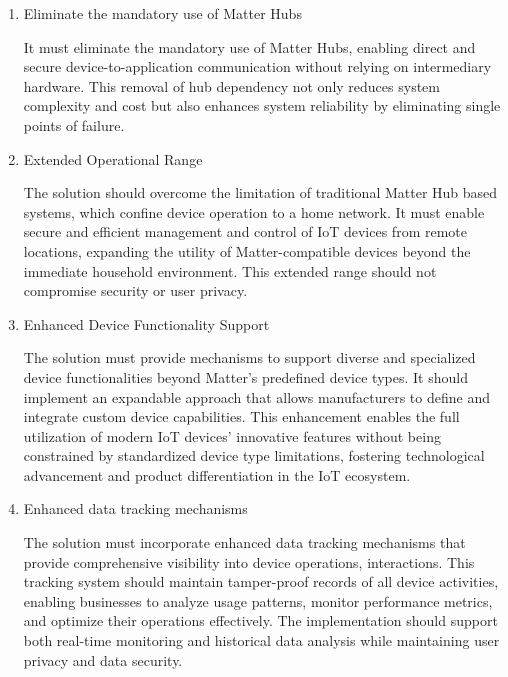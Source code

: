\documentclass[conference]{IEEEtran}
\begin{document}
\begin{enumerate}[itemsep=2ex, parsep=1ex]
	\item Eliminate the mandatory use of Matter Hubs
	      	      	      
	      It must eliminate the mandatory use of Matter Hubs, enabling direct and secure
	      device-to-application communication without relying on intermediary hardware.
	      This removal of hub dependency not only reduces system complexity and cost
	      but also enhances system reliability by eliminating single points of
	      failure.
	      	      	      
	\item Extended Operational Range
	      	      	      
	      The solution should overcome the limitation of traditional Matter Hub based
	      systems, which confine device operation to a home network. It must enable
	      secure and efficient management and control of IoT devices from remote
	      locations, expanding the utility of Matter-compatible devices beyond the immediate
	      household environment. This extended range should not compromise security
	      or user privacy.
	      	      	      
	\item Enhanced Device Functionality Support
	      	      	                  
	      The solution must provide mechanisms to support diverse and specialized device functionalities beyond Matter's predefined device types. It should implement an expandable approach that allows manufacturers to define and integrate custom device capabilities. This enhancement enables the full utilization of modern IoT devices' innovative features without being constrained by standardized device type limitations, fostering technological advancement and product differentiation in the IoT ecosystem.
	      	      	      
	\item Enhanced data tracking mechanisms
	      	      	      
	      The solution must incorporate enhanced data tracking mechanisms that
	      provide comprehensive visibility into device operations, interactions.
	      This tracking system should maintain tamper-proof records of all device
	      activities, enabling businesses to analyze usage patterns, monitor
	      performance metrics, and optimize their operations effectively. The
	      implementation should support both real-time monitoring and historical
	      data analysis while maintaining user privacy and data security.
	      	      	      

\end{enumerate}
\end{document}
